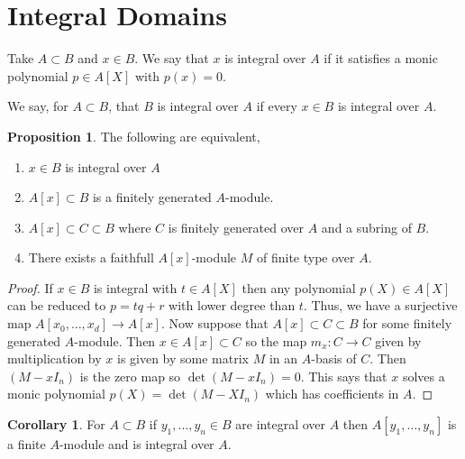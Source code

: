 \documentclass[12pt]{article}
\theoremstyle{remark}
\theoremstyle{definition}
\newtheorem{proposition}[theorem]{Proposition}
\newtheorem{corollary}[theorem]{Corollary}
\newenvironment{definition}[1][Definition:]{\begin{trivlist}
\item[\hskip \labelsep {\bfseries #1}]}{\end{trivlist}}
\begin{document}
\section{Integral Domains}

\begin{definition}
Take $A \subset B$ and $x \in B$. We say that $x$ is integral over $A$ if it satisfies a monic polynomial $p \in A[X]$ with $p(x) = 0$. 
\end{definition}

\begin{definition}
We say, for $A \subset B$, that $B$ is integral over $A$ if every $x \in B$ is integral over $A$.
\end{definition}

\begin{proposition}
The following are equivalent,
\begin{enumerate}
\item $x \in B$ is integral over $A$

\item $A[x] \subset B$ is a finitely generated $A$-module.

\item $A[x] \subset C \subset B$ where $C$ is finitely generated over $A$ and a subring of $B$.  

\item There exists a faithfull $A[x]$-module $M$ of finite type over $A$.
\end{enumerate}
\end{proposition}

\begin{proof}
If $x \in B$ is integral with $t \in A[X]$ then any polynomial $p(X) \in A[X]$ can be reduced to $p = tq + r$ with lower degree than $t$. Thus, we have a surjective map $A[x_0, \dots, x_d] \to A[x]$. Now suppose that $A[x] \subset C \subset B$ for some finitely generated $A$-module. Then $x \in A[x] \subset C$ so the map $m_x : C \to C$ given by multiplication by $x$ is given by some matrix $M$ in an $A$-basis of $C$. Then $(M - x I_n)$ is the zero map so $\det{(M - x I_n)} = 0$. This says that $x$ solves a monic polynomial $p(X) = \det{(M - X I_n)}$ which has coefficients in $A$. 
\end{proof}

\begin{corollary}
For $A \subset B$ if $y_1, \dots, y_n \in B$ are integral over $A$ then $A[y_1, \dots, y_n]$ is a finite $A$-module and is integral over $A$. 
\end{corollary}
\end{document}
